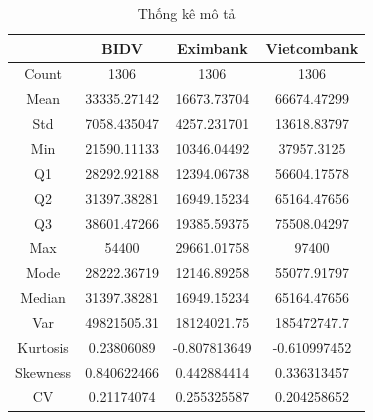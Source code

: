 \begin{table}[H]
    \centering
    \caption{Thống kê mô tả}
    \begin{tabular}{|c|c|c|c|}
         \hline
         \centering\  & BIDV & Eximbank & Vietcombank\\\hline
         \multirow{1}{*}{Count} & 1306 & 1306 & 1306 \\\hline
         \multirow{1}{*}{Mean} & 33335.27142 & 16673.73704 & 66674.47299 \\\hline
         \multirow{1}{*}{Std} & 7058.435047 & 4257.231701 & 13618.83797 \\\hline
         \multirow{1}{*}{Min} & 21590.11133 & 10346.04492 & 37957.3125 \\\hline
         \multirow{1}{*}{Q1} & 28292.92188 & 12394.06738 & 56604.17578 \\\hline
         \multirow{1}{*}{Q2} & 31397.38281 & 16949.15234 & 65164.47656 \\\hline
         \multirow{1}{*}{Q3} & 38601.47266 & 19385.59375 & 75508.04297 \\\hline
         \multirow{1}{*}{Max}  & 54400 & 29661.01758  & 97400 \\\hline
         \multirow{1}{*}{Mode} & 28222.36719 & 12146.89258 & 55077.91797 \\\hline
         \multirow{1}{*}{Median} & 31397.38281 & 16949.15234 & 65164.47656 \\\hline
         \multirow{1}{*}{Var} & 49821505.31 & 18124021.75 & 185472747.7 \\\hline
         \multirow{1}{*}{Kurtosis} & 0.23806089 & -0.807813649 & -0.610997452 \\\hline
         \multirow{1}{*}{Skewness} & 0.840622466 & 0.442884414 & 0.336313457 \\\hline
         \multirow{1}{*}{CV} & 0.21174074 & 0.255325587 & 0.204258652 \\\hline
    \end{tabular}
    \label{descriptive-stats}
\end{table}
